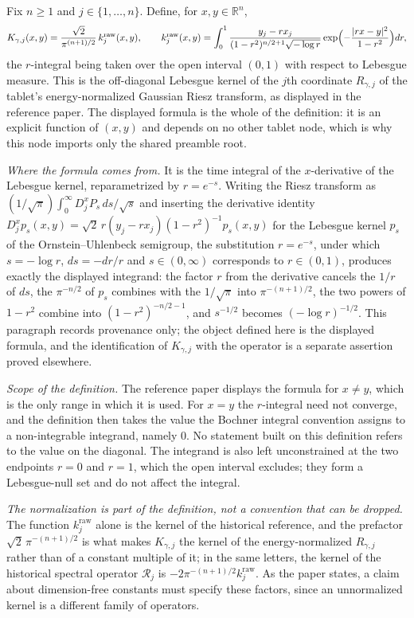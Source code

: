 \begin{definition}
Fix $n \geq 1$ and $j \in \{1,\ldots,n\}$.  Define, for $x, y \in \mathbb{R}^n$,
\[
  K_{\gamma,j}(x,y) = \frac{\sqrt2}{\pi^{(n+1)/2}}\,k_j^{\mathrm{raw}}(x,y),
  \qquad
  k_j^{\mathrm{raw}}(x,y)
    = \int_0^1 \frac{y_j - r x_j}{(1-r^2)^{n/2+1}\sqrt{-\log r}}
        \exp\Bigl(-\frac{|rx-y|^2}{1-r^2}\Bigr) dr ,
\]
the $r$-integral being taken over the open interval $(0,1)$ with respect to
Lebesgue measure.  This is the off-diagonal Lebesgue kernel of the $j$th
coordinate $R_{\gamma,j}$ of the tablet's energy-normalized Gaussian Riesz
transform, as displayed in the reference paper.  The displayed formula is the
whole of the definition: it is an explicit function of $(x,y)$ and depends on no
other tablet node, which is why this node imports only the shared preamble root.

\emph{Where the formula comes from.}  It is the time integral of the
$x$-derivative of the Lebesgue kernel, reparametrized by $r = e^{-s}$.  Writing
the Riesz transform as $(1/\sqrt\pi)\int_0^\infty D^x_j P_s\,ds/\sqrt s$ and
inserting the derivative identity
$D_j^x p_s(x,y) = \sqrt2\,r(y_j-rx_j)(1-r^2)^{-1}p_s(x,y)$ for the Lebesgue
kernel $p_s$ of the Ornstein--Uhlenbeck semigroup, the substitution $r = e^{-s}$, under
which $s = -\log r$, $ds = -dr/r$ and $s \in (0,\infty)$ corresponds to
$r \in (0,1)$, produces exactly the displayed integrand: the factor $r$ from the
derivative cancels the $1/r$ of $ds$, the $\pi^{-n/2}$ of $p_s$ combines with the
$1/\sqrt\pi$ into $\pi^{-(n+1)/2}$, the two powers of $1-r^2$ combine into
$(1-r^2)^{-n/2-1}$, and $s^{-1/2}$ becomes $(-\log r)^{-1/2}$.  This paragraph
records provenance only; the object defined here is the displayed formula, and
the identification of $K_{\gamma,j}$ with the operator is a separate assertion
proved elsewhere.

\emph{Scope of the definition.}  The reference paper displays the formula for
$x \neq y$, which is the only range in which it is used.  For $x = y$ the
$r$-integral need not converge, and the definition then takes the value the
Bochner integral convention assigns to a non-integrable integrand, namely $0$.
No statement built on this definition refers to the value on the diagonal.  The
integrand is also left unconstrained at the two endpoints $r = 0$ and $r = 1$,
which the open interval excludes; they form a Lebesgue-null set and do not affect
the integral.

\emph{The normalization is part of the definition, not a convention that can be
dropped.}  The function $k_j^{\mathrm{raw}}$ alone is the kernel of the
historical reference, and the prefactor $\sqrt2\,\pi^{-(n+1)/2}$ is what makes
$K_{\gamma,j}$ the kernel of the energy-normalized $R_{\gamma,j}$ rather than of
a constant multiple of it; in the same letters, the kernel of the historical
spectral operator $\mathcal{R}_j$ is $-2\pi^{-(n+1)/2}k_j^{\mathrm{raw}}$.  As
the paper states, a claim about dimension-free constants must specify these
factors, since an unnormalized kernel is a different family of operators.
\end{definition}
